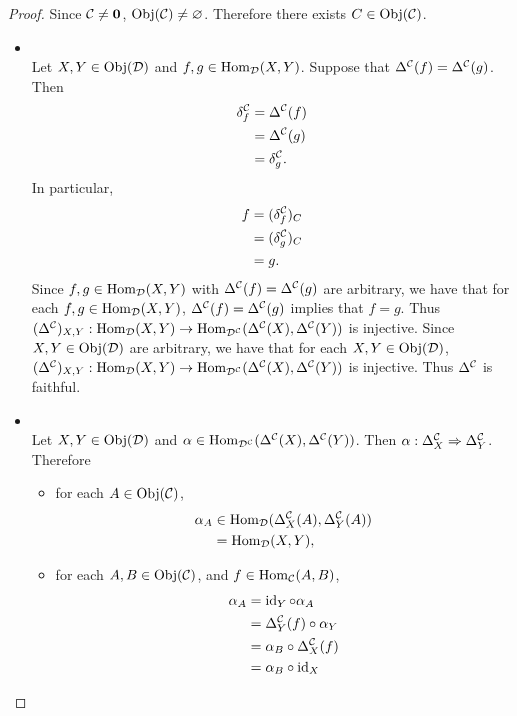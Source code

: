\documentclass{book}
\begin{document}
	\begin{proof}
		Since $\mathcal{C} \neq \mathbf{0}$, $\operatorname{Obj}(\mathcal{C}) \neq \varnothing$. Therefore there exists $C \in \operatorname{Obj}(\mathcal{C})$.
		\begin{itemize}
			\item {} \\
			Let $X,Y \in \operatorname{Obj}(\mathcal{D})$ and $f,g \in \operatorname{Hom}_{\mathcal{D}}(X,Y)$. Suppose that $\Delta^{\mathcal{C}}(f) = \Delta^{\mathcal{C}}(g)$. Then 
			\begin{align*}
				\delta^{\mathcal{C}}_f
				& = \Delta^{\mathcal{C}}(f) \\
				& = \Delta^{\mathcal{C}}(g) \\
				& = \delta^{\mathcal{C}}_g. 
			\end{align*}
			In particular, 
			\begin{align*}
				f
				& = (\delta^{\mathcal{C}}_f)_C \\
				& = (\delta^{\mathcal{C}}_g)_C \\
				& = g. 
			\end{align*}
			Since $f,g \in \operatorname{Hom}_{\mathcal{D}}(X,Y)$ with $\Delta^{\mathcal{C}}(f) = \Delta^{\mathcal{C}}(g)$ are arbitrary, we have that for each $f,g \in \operatorname{Hom}_{\mathcal{D}}(X,Y)$, $\Delta^{\mathcal{C}}(f) = \Delta^{\mathcal{C}}(g)$ implies that $f = g$. Thus $(\Delta^{\mathcal{C}})_{X,Y}:\operatorname{Hom}_{\mathcal{D}}(X,Y) \rightarrow \operatorname{Hom}_{\mathcal{D}^{\mathcal{C}}}(\Delta^{\mathcal{C}}(X), \Delta^{\mathcal{C}}(Y))$ is injective. Since $X,Y \in \operatorname{Obj}(\mathcal{D})$ are arbitrary, we have that for each $X,Y \in \operatorname{Obj}(\mathcal{D})$, $(\Delta^{\mathcal{C}})_{X,Y}:\operatorname{Hom}_{\mathcal{D}}(X,Y) \rightarrow \operatorname{Hom}_{\mathcal{D}^{\mathcal{C}}}(\Delta^{\mathcal{C}}(X), \Delta^{\mathcal{C}}(Y))$ is injective. Thus $\Delta^{\mathcal{C}}$ is faithful.
			\item {} \\
			Let $X,Y \in \operatorname{Obj}(\mathcal{D})$ and $\alpha \in \operatorname{Hom}_{\mathcal{D}^{\mathcal{C}}}(\Delta^{\mathcal{C}}(X), \Delta^{\mathcal{C}}(Y))$. Then $\alpha: \Delta^{\mathcal{C}}_X \Rightarrow \Delta^{\mathcal{C}}_Y$. Therefore
			\begin{itemize}
				\item for each $A \in \operatorname{Obj}(\mathcal{C})$, 
				\begin{align*}
					\alpha_A 
					& \in \operatorname{Hom}_{\mathcal{D}}(\Delta^{\mathcal{C}}_X(A), \Delta^{\mathcal{C}}_Y(A)) \\
					& = \operatorname{Hom}_{\mathcal{D}}(X, Y),
				\end{align*}
				\item for each $A, B \in \operatorname{Obj}(\mathcal{C})$, and $f \in \operatorname{Hom}_{\mathcal{C}}(A,B)$, 
				\begin{align*}
					\al_A 
					& = \id_Y \circ \al_A \\
					& = \Del^{\MC}_Y(f) \circ \al_Y \\
					& = \al_B \circ \Del^{\MC}_X(f) \\
					& = \al_B \circ \id_X \\

\end{align*}
\end{itemize}
\end{itemize}
\end{proof}
\end{document}
